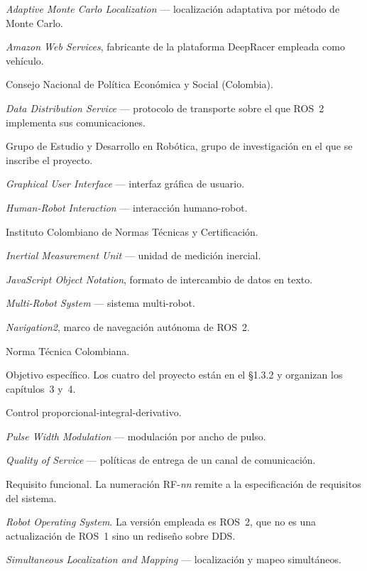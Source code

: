 \begin{description}[style=nextline,leftmargin=1.5em,itemsep=0.2em]
  \item[AMCL] \textit{Adaptive Monte Carlo Localization} — localización adaptativa
    por método de Monte Carlo.
  \item[AWS] \textit{Amazon Web Services}, fabricante de la plataforma DeepRacer
    empleada como vehículo.
  \item[CONPES] Consejo Nacional de Política Económica y Social (Colombia).
  \item[DDS] \textit{Data Distribution Service} — protocolo de transporte sobre
    el que ROS~2 implementa sus comunicaciones.
  \item[GED] Grupo de Estudio y Desarrollo en Robótica, grupo de investigación en
    el que se inscribe el proyecto.
  \item[GUI] \textit{Graphical User Interface} — interfaz gráfica de usuario.
  \item[HRI] \textit{Human-Robot Interaction} — interacción humano-robot.
  \item[ICONTEC] Instituto Colombiano de Normas Técnicas y Certificación.
  \item[IMU] \textit{Inertial Measurement Unit} — unidad de medición inercial.
  \item[JSON] \textit{JavaScript Object Notation}, formato de intercambio de
    datos en texto.
  \item[MRS] \textit{Multi-Robot System} — sistema multi-robot.
  \item[Nav2] \textit{Navigation2}, marco de navegación autónoma de ROS~2.
  \item[NTC] Norma Técnica Colombiana.
  \item[OE] Objetivo específico. Los cuatro del proyecto están en el §1.3.2 y
    organizan los capítulos~3 y~4.
  \item[PID] Control proporcional-integral-derivativo.
  \item[PWM] \textit{Pulse Width Modulation} — modulación por ancho de pulso.
  \item[QoS] \textit{Quality of Service} — políticas de entrega de un canal de
    comunicación.
  \item[RF] Requisito funcional. La numeración RF-\textit{nn} remite a la
    especificación de requisitos del sistema.
  \item[ROS] \textit{Robot Operating System}. La versión empleada es ROS~2, que
    no es una actualización de ROS~1 sino un rediseño sobre DDS.
  \item[SLAM] \textit{Simultaneous Localization and Mapping} — localización y
    mapeo simultáneos.
\end{description}
